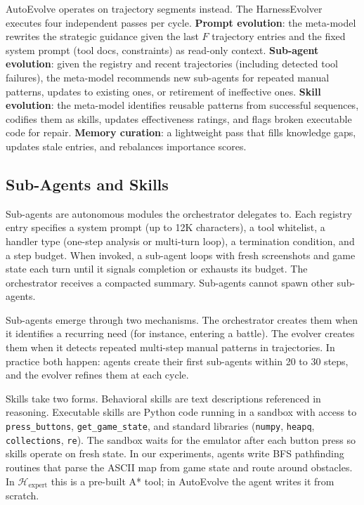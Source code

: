 AutoEvolve operates on trajectory segments instead. The HarnessEvolver executes four independent passes per cycle. \textbf{Prompt evolution}: the meta-model rewrites the strategic guidance given the last $F$ trajectory entries and the fixed system prompt (tool docs, constraints) as read-only context. \textbf{Sub-agent evolution}: given the registry and recent trajectories (including detected tool failures), the meta-model recommends new sub-agents for repeated manual patterns, updates to existing ones, or retirement of ineffective ones. \textbf{Skill evolution}: the meta-model identifies reusable patterns from successful sequences, codifies them as skills, updates effectiveness ratings, and flags broken executable code for repair. \textbf{Memory curation}: a lightweight pass that fills knowledge gaps, updates stale entries, and rebalances importance scores.

\subsection{Sub-Agents and Skills}\label{sec:subagents-skills}

Sub-agents are autonomous modules the orchestrator delegates to. Each registry entry specifies a system prompt (up to 12K characters), a tool whitelist, a handler type (one-step analysis or multi-turn loop), a termination condition, and a step budget. When invoked, a sub-agent loops with fresh screenshots and game state each turn until it signals completion or exhausts its budget. The orchestrator receives a compacted summary. Sub-agents cannot spawn other sub-agents.

Sub-agents emerge through two mechanisms. The orchestrator creates them when it identifies a recurring need (for instance, entering a battle). The evolver creates them when it detects repeated multi-step manual patterns in trajectories. In practice both happen: agents create their first sub-agents within 20 to 30 steps, and the evolver refines them at each cycle.

Skills take two forms. Behavioral skills are text descriptions referenced in reasoning. Executable skills are Python code running in a sandbox with access to \texttt{press\_buttons}, \texttt{get\_game\_state}, and standard libraries (\texttt{numpy}, \texttt{heapq}, \texttt{collections}, \texttt{re}). The sandbox waits for the emulator after each button press so skills operate on fresh state. In our experiments, agents write BFS pathfinding routines that parse the ASCII map from game state and route around obstacles. In $\mathcal{H}_{\text{expert}}$ this is a pre-built A* tool; in AutoEvolve the agent writes it from scratch.

